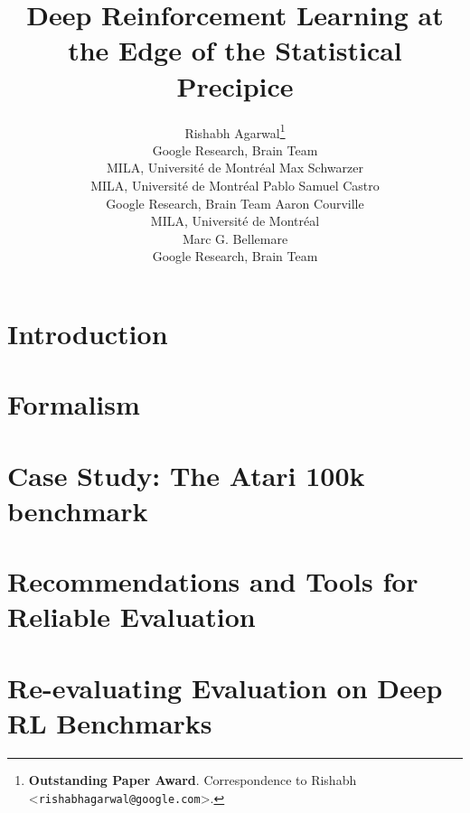 \documentclass{article}
\title{Deep Reinforcement Learning at the Edge of the Statistical Precipice}
\author{Rishabh Agarwal\thanks{\textbf{Outstanding Paper Award}. Correspondence to Rishabh <\texttt{rishabhagarwal@google.com}>.} \\
Google Research, Brain Team\\
{\small MILA}, Université de Montréal
\And Max Schwarzer \\
{\small MILA}, Université de Montréal
\And Pablo Samuel Castro \\
Google Research, Brain Team
\AND
    Aaron Courville \\ 
    {\small MILA}, Université de Montréal \\ 
\And
    Marc G. Bellemare \\ 
    Google Research, Brain Team \\
 }
\begin{document}
\maketitle

\vspace{-0.1cm}
\begin{abstract}
\vspace{-0.1cm}

\end{abstract}


\vspace{-0.1cm}
\section{Introduction}
\vspace{-0.1cm}


\vspace{-0.35cm}
\section{Formalism}\label{sec:formalism}
\vspace{-0.25cm}


\vspace{-0.25cm}
\section{Case Study: The Atari 100k benchmark}\label{sec:case_study}
\vspace{-0.2cm}




\vspace{-0.2cm}
\section{Recommendations and Tools for Reliable Evaluation}
\label{sec:uncertainty}
\vspace{-0.15cm}


\vspace{-0.2cm}
\section{Re-evaluating Evaluation on Deep RL Benchmarks}
\label{sec:reevaluating_eval}
\vspace{-0.15cm}

\end{document}
